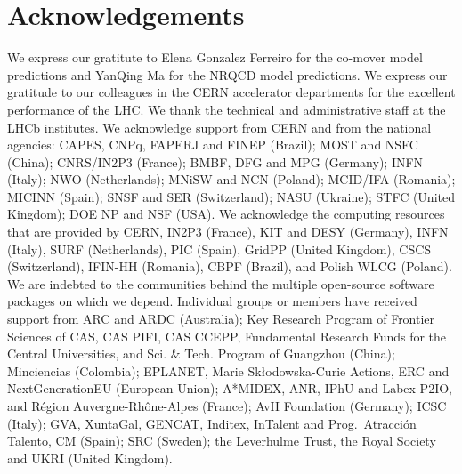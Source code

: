 \documentclass[12pt,a4paper]{article}
\begin{document}
\section*{Acknowledgements}
%
%
We express our gratitute to Elena Gonzalez Ferreiro for the co-mover model predictions and YanQing Ma for the NRQCD model predictions.
We express our gratitude to our colleagues in the CERN
accelerator departments for the excellent performance of the LHC. We
thank the technical and administrative staff at the LHCb
institutes.
We acknowledge support from CERN and from the national agencies:
CAPES, CNPq, FAPERJ and FINEP (Brazil); 
MOST and NSFC (China); 
CNRS/IN2P3 (France); 
BMBF, DFG and MPG (Germany); 
INFN (Italy); 
NWO (Netherlands); 
MNiSW and NCN (Poland); 
MCID/IFA (Romania); 
MICINN (Spain); 
SNSF and SER (Switzerland); 
NASU (Ukraine); 
STFC (United Kingdom); 
DOE NP and NSF (USA).
We acknowledge the computing resources that are provided by CERN, IN2P3
(France), KIT and DESY (Germany), INFN (Italy), SURF (Netherlands),
PIC (Spain), GridPP (United Kingdom), 
CSCS (Switzerland), IFIN-HH (Romania), CBPF (Brazil),
and Polish WLCG (Poland).
We are indebted to the communities behind the multiple open-source
software packages on which we depend.
Individual groups or members have received support from
ARC and ARDC (Australia);
Key Research Program of Frontier Sciences of CAS, CAS PIFI, CAS CCEPP, 
Fundamental Research Funds for the Central Universities, 
and Sci. \& Tech. Program of Guangzhou (China);
Minciencias (Colombia);
EPLANET, Marie Sk\l{}odowska-Curie Actions, ERC and NextGenerationEU (European Union);
A*MIDEX, ANR, IPhU and Labex P2IO, and R\'{e}gion Auvergne-Rh\^{o}ne-Alpes (France);
AvH Foundation (Germany);
ICSC (Italy); 
GVA, XuntaGal, GENCAT, Inditex, InTalent and Prog.~Atracci\'on Talento, CM (Spain);
SRC (Sweden);
the Leverhulme Trust, the Royal Society
 and UKRI (United Kingdom).

\clearpage
\end{document}

